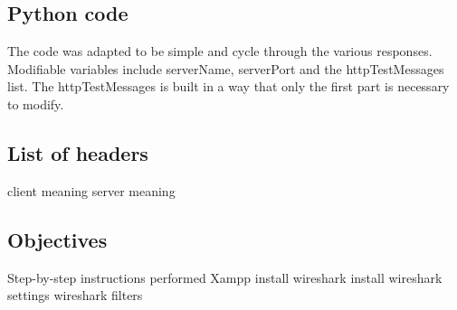 \documentclass[11pt]{report}
\begin{document}
    \subsection{Python code}
        \lstset{style=pythoncode}
        
        The code was adapted to be simple and cycle through the various responses.
        Modifiable variables include serverName, serverPort and the httpTestMessages list.
        The httpTestMessages is built in a way that only the first part is necessary to modify.
    
    \subsection{List of headers}
        client
            meaning
        server
            meaning
    
    \subsection{Objectives}
        Step-by-step instructions performed
        Xampp install
        wireshark install
        wireshark settings
        wireshark filters
        
\end{document}
